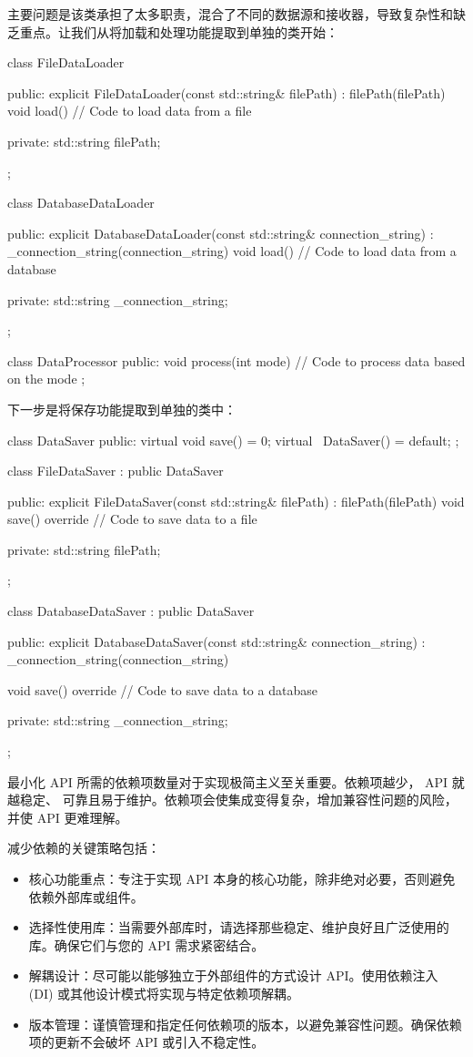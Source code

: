 主要问题是该类承担了太多职责，混合了不同的数据源和接收器，导致复杂性和缺乏重点。让我们从将加载和处理功能提取到单独的类开始：

\begin{cpp}
class FileDataLoader {
public:
    explicit FileDataLoader(const std::string& filePath) : filePath(filePath) {}
    void load() {
        // Code to load data from a file
    }

private:
    std::string filePath;
};

class DatabaseDataLoader {
public:
    explicit DatabaseDataLoader(const std::string& connection_string)
    : _connection_string(connection_string) {}
    void load() {
        // Code to load data from a database
    }

private:
    std::string _connection_string;
};

class DataProcessor {
public:
    void process(int mode) {
        // Code to process data based on the mode
    }
};
\end{cpp}

下一步是将保存功能提取到单独的类中：

\begin{cpp}
class DataSaver {
public:
    virtual void save() = 0;
    virtual ~DataSaver() = default;
};

class FileDataSaver : public DataSaver {
public:
    explicit FileDataSaver(const std::string& filePath) :
    filePath(filePath) {}
    void save() override {
        // Code to save data to a file
    }

private:
    std::string filePath;
};

class DatabaseDataSaver : public DataSaver {
public:
    explicit DatabaseDataSaver(const std::string& connection_string) : _connection_string(connection_string) {}

    void save() override {
        // Code to save data to a database
    }

private:
    std::string _connection_string;
};
\end{cpp}

最小化 API 所需的依赖项数量对于实现极简主义至关重要。依赖项越少， API 就越稳定、 可靠且易于维护。依赖项会使集成变得复杂，增加兼容性问题的风险，并使 API 更难理解。

减少依赖的关键策略包括：

\begin{itemize}
\item
核心功能重点：专注于实现 API 本身的核心功能，除非绝对必要，否则避免依赖外部库或组件。

\item
选择性使用库：当需要外部库时，请选择那些稳定、维护良好且广泛使用的库。确保它们与您的 API 需求紧密结合。

\item
解耦设计：尽可能以能够独立于外部组件的方式设计 API。使用依赖注入 (DI) 或其他设计模式将实现与特定依赖项解耦。

\item
版本管理：谨慎管理和指定任何依赖项的版本，以避免兼容性问题。确保依赖项的更新不会破坏 API 或引入不稳定性。
\end{itemize}

